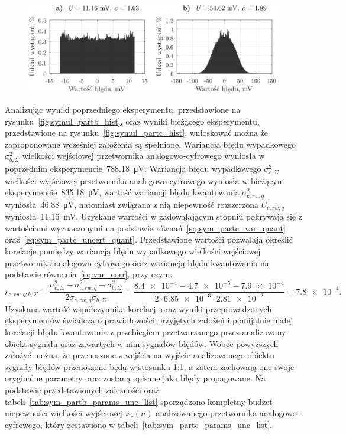 \begin{figure}[htb!]
\begin{center}
\includegraphics{obrazki/hist_part_c}
\end{center}
\end{figure}

Analizując wyniki poprzedniego eksperymentu, przedstawione na rysunku~\ref{fig:symul_partb_hist}, oraz wyniki bieżącego eksperymentu, przedstawione na rysunku~\ref{fig:symul_partc_hist}, wnioskować można że zaproponowane wcześniej założenia są spełnione. Wariancja błędu wypadkowego $\sigma_{b,\Sigma}^{2}$ wielkości wejściowej przetwornika analogowo-cyfrowego wyniosła w poprzednim eksperymencie~\qty{788.18}{\micro V}. Wariancja błędu wypadkowego $\sigma_{c,\Sigma}^{2}$ wielkości wyjściowej przetwornika analogowo-cyfrowego wyniosła w bieżącym eksperymencie~\qty{835.18}{\micro V}, wartość wariancji błędu kwantowania $\sigma_{c,rw,q}^{2}$ wyniosła~\qty{46.88}{\micro V}, natomiast związana z nią niepewność rozszerzona $U_{c,rw,q}$ wyniosła~\qty{11.16}{mV}. Uzyskane wartości w zadowalającym stopniu pokrywają się z wartościami wyznaczonymi na podstawie równań~\eqref{eq:sym_partc_var_quant} oraz~\eqref{eq:sym_partc_uncert_quant}. Przedstawione wartości pozwalają określić korelacje pomiędzy wariancją błędu wypadkowego wielkości wejściowej przetwornika analogowo-cyfrowego oraz wariancją błędu kwantowania na podstawie równania~\eqref{eq:var_corr}, przy czym:
\begin{equation}
r_{c,rw,q;b,\Sigma} = \frac{\sigma_{c,\Sigma}^{2} - \sigma_{c,rw,q}^{2} - \sigma_{b,\Sigma}^{2}}{2 \sigma_{c,rw,q} \sigma_{b,\Sigma}} = \frac{\num{8.4e-4} - \num{4.7e-5} - \num{7.9e-4}}{2 \cdot \num{6.85e-3} \cdot \num{2.81e-2}} = \num{7.8e-4} \label{eq:sym_partc_corr}.
\end{equation}
Uzyskana wartość współczynnika korelacji oraz wyniki przeprowadzonych eksperymentów świadczą o prawidłowości przyjętych założeń i pomijalnie małej korelacji błędu kwantowania z przebiegiem przetwarzanego przez analizowany obiekt sygnału oraz zawartych w nim sygnałów błędów. Wobec powyższych założyć można, że przenoszone z wejścia na wyjście analizowanego obiektu sygnały błędów przenoszone będą w stosunku 1:1, a zatem zachowają one swoje oryginalne parametry oraz zostaną opisane jako błędy propagowane. Na podstawie przedstawionych zależności oraz tabeli~\ref{tab:sym_partb_params_unc_list} sporządzono kompletny budżet niepewności wielkości wyjściowej $x_{c}(n)$ analizowanego przetwornika analogowo-cyfrowego, który zestawiono w tabeli~\ref{tab:sym_partc_params_unc_list}.


